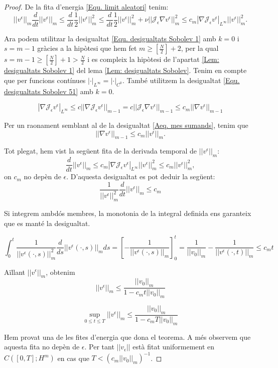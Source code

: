 \documentclass{article}
\numberwithin{equation}{section}
\begin{document}
\begin{proof}
De la fita d'energia \eqref{Equ. limit aleatori} tenim:
\[||v^{\epsilon}||_m\frac{d}{dt}||v^{\epsilon}||_m\leq\frac{d}{dt}\frac{1}{2}||v^{\epsilon}||_m^2\leq\frac{d}{dt}\frac{1}{2}||v^{\epsilon}||_m^2+\nu||\mathcal{J}_{\epsilon}\nabla v^{\epsilon}||_m^2\leq c_m|\nabla\mathcal{J}_{\epsilon}v^{\epsilon}|_{L^{\infty}}||v^{\epsilon}||_m^2.\]

Ara podem utilitzar la desigualtat \eqref{Equ. desigualtats Sobolev 1} amb $k=0$ i $s=m-1$ gr\`{a}cies a la hip\`{o}tesi que hem fet $m\geq\left[\frac{N}{2}\right]+2$, per la qual $s=m-1\geq\left[\frac{N}{2}\right]+1>\frac{N}{2}$ i es compleix la hip\`{o}tesi de l'apartat \ref{Lem: desigualtats Sobolev 1} del lema \ref{Lem: desigualtats Sobolev}. Tenim en compte que per funcions cont\'{i}nues $|\cdot|_{L^{\infty}}=|\cdot|_{C^0}$. Tamb\'{e} utilitzem la desigualtat \eqref{Equ. desigualtats Sobolev 51} amb $k=0$.

\[|\nabla\mathcal{J}_{\epsilon}v^{\epsilon}|_{L^{\infty}}\leq c||\nabla\mathcal{J}_{\epsilon}v^{\epsilon}||_{m-1}=c||\mathcal{J}_{\epsilon}\nabla v^{\epsilon}||_{m-1}\leq c_m||\nabla v^{\epsilon}||_{m-1}\]

Per un raonament semblant al de la desigualtat \eqref{Aeq. mes sumands}, tenim que
\[||\nabla v^{\epsilon}||_{m-1}\leq c_m||v^{\epsilon}||_m.\]

Tot plegat, hem vist la seg\"{u}ent fita de la derivada temporal de $||v^{\epsilon}||_m$:
\[\frac{d}{dt}||v^{\epsilon}||_m\leq c_m|\nabla\mathcal{J}_{\epsilon}v^{\epsilon}|_{L^{\infty}}||v^{\epsilon}||_m^2\leq c_m||v^{\epsilon}||_m^2,\]
on $c_m$ no dep\`{e}n de $\epsilon$. D'aquesta desigualtat es pot deduir la seg\"{u}ent:
\[\frac{1}{||v^{\epsilon}||_m^2}\frac{d}{dt}||v^{\epsilon}||_m\leq c_m\]

Si integrem ambd\'{o}s membres, la monotonia de la integral definida ens garanteix que es mant\'{e} la desigualtat.

\[\int_0^t\frac{1}{||v^{\epsilon}(\cdot,s)||_m^2}\frac{d}{ds}||v^{\epsilon}(\cdot,s)||_mds=\left[-\frac{1}{||v^{\epsilon}(\cdot,s)||_m}\right]_0^t=\frac{1}{||v_0||_m}-\frac{1}{||v^{\epsilon}(\cdot,t)||_m}\leq c_mt\]

A\"{i}llant $||v^{\epsilon}||_m$, obtenim
\[||v^{\epsilon}||_m\leq\frac{||v_0||_m}{1-c_mt||v_0||_m}\]

\[\sup_{0\leq t\leq T}||v^{\epsilon}||_m\leq\frac{||v_0||_m}{1-c_mT||v_0||_m}\]

Hem provat una de les fites d'energia que dona el teorema. A m\'{e}s observem que aquesta fita no dep\`{e}n de $\epsilon$. Per tant $||v_{\epsilon}||$ est\`{a} fitat uniformement en $C([0,T];H^m)$ en cas que $T<(c_m||v_0||_m)^{-1}$.


\end{proof}
\end{document}
